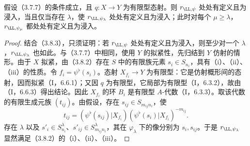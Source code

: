 假设（3.7.7）的条件成立，且 $q:X\to Y$ 为有限型态射。则 $r_{\LL,\psi}$ 处处有定义且为浸入，当且仅当存在 $\lambda$，使 $r_{\LL,\psi_\lambda}$ 处处有定义且为浸入；此时对每个 $\mu\geq\lambda$，$r_{\LL,\psi_\mu}$ 都处处有定义且为浸入。
\begin{proof}
结合（3.8.3），只须证明：若 $r_{\LL,\psi}$ 处处有定义且为浸入，则至少对一个 $\lambda$，$r_{\LL,\psi_\lambda}$ 也如此。与（3.7.7）中相同，使用 $Y$ 的拟紧性，先归结到 $Y$ 仿射的情形。由于 $X$ 拟紧，由（3.8.2）存在 $S$ 中的有限族元素 $s_i\in S_{n_i}$，具有（i）、（ii）、（iii）的性质。令 $f_i=\psi^\flat(s_i)$。态射 $X_{f_i}\to Y$ 为有限型：它是仿射概形间的态射，因而拟紧（I，6.6.1）；又因 $q$ 为有限型，它局部为有限型（I，6.3.2），故由（I，6.6.3）得出结论。因此 $X_{f_i}$ 的环 $B_i$ 是有限型 $A$-代数（I，6.3.3）。取该代数的有限生成元族 $(t_{ij})$。由假设，存在 $s_{ij}\in S_{m_{ij}n_i}$，使
\[
t_{ij}=(\psi^\flat(s_{ij})|X_{f_i})(\psi^\flat(s_i)|X_{f_i})^{-m_{ij}}.
\]
存在 $\lambda$ 以及 $s'_i\in S^\lambda_{n_i}$、$s'_{ij}\in S^\lambda_{m_{ij}n_i}$，其在 $\varphi_\lambda$ 下的像分别为 $s_i,s_{ij}$。于是 $r_{\LL,\psi_\lambda}$ 显然满足（3.8.2）的（i）、（ii）、（iii）。
\end{proof}

